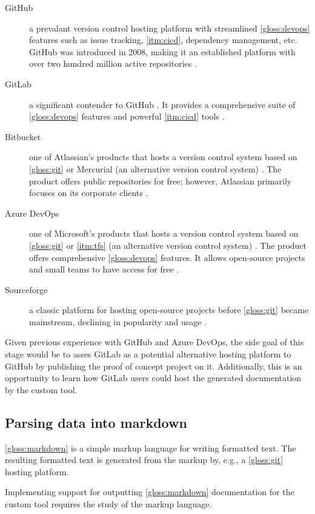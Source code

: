 \begin{description}
    \item[GitHub] a prevalant version control hosting platform \cite{daniel_github_2022} with streamlined \ref{gloss:devops} features such as issue tracking, \ref{itm:cicd}, dependency management, etc. GitHub was introduced in 2008, making it an established platform with over two hundred million active repositories \cite{daniel_github_2022}.
    \item[GitLab] a significant contender to GitHub \cite{gumster_6_2018}. It provides a comprehensive suite of \ref{gloss:devops} features and powerful \ref{itm:cicd} tools \cite{gumster_6_2018}.
    \item[Bitbucket] one of Atlassian's products that hosts a version control system based on \ref{gloss:git} or Mercurial (an alternative version control system) \cite{atlassian_bitbucket_nodate}. The product offers public repositories for free; however, Atlassian primarily focuses on its corporate clients \cite{interviewbit_bitbucket_2022}.
    \item[Azure DevOps] one of Microsoft's products that hosts a version control system based on \ref{gloss:git} or \ref{itm:tfs} (an alternative version control system) \cite{microsoft_azure_nodate}. The product offers comprehensive \ref{gloss:devops} features. It allows open-source projects and small teams to have access for free \cite{microsoft_azure_nodate}.
    \item[Sourceforge] a classic platform for hosting open-source projects before \ref{gloss:git} became mainstream, declining in popularity and usage \cite{gumster_6_2018}.
\end{description}

Given previous experience with GitHub and Azure DevOps, the side goal of this stage would be to asses GitLab as a potential alternative hosting platform to GitHub by publishing the proof of concept project on it. Additionally, this is an opportunity to learn how GitLab users could host the generated documentation by the custom tool.

\subsection{Parsing data into markdown}
\ref{gloss:markdown} is a simple markup language for writing formatted text. The resulting formatted text is generated from the markup by, e.g., a \ref{gloss:git} hosting platform.

Implementing support for outputting \ref{gloss:markdown} documentation for the custom tool requires the study of the markup language.

